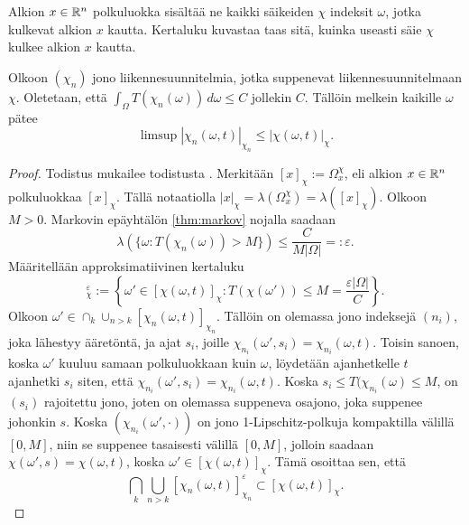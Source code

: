 \documentclass[12pt,oneside,a4paper]{amsbook} %
\begin{document}
Alkion $x\in \mathbb{R}^n$ polkuluokka sisältää ne kaikki säikeiden $\chi$ indeksit $\omega$, jotka kulkevat alkion $x$ kautta. Kertaluku kuvastaa taas sitä, kuinka useasti säie $\chi$ kulkee alkion $x$ kautta.

\begin{theorem} \label{thm:multiplicityXnLeX}
    Olkoon $(\chi_n)$ jono liikennesuunnitelmia, jotka suppenevat liikennesuunnitelmaan $\chi$. Oletetaan, että $\int_\Omega T(\chi_n(\omega))\, d\omega \le C$ jollekin $C$. Tällöin melkein kaikille $\omega$ pätee
    \begin{equation*}
        \limsup |\chi_n(\omega, t)|_{\chi_n} \le |\chi(\omega, t)|_\chi.
    \end{equation*}
\end{theorem}
\begin{proof}
    Todistus mukailee todistusta \cite[s. 31-32]{optimal}. Merkitään $[x]_\chi := \Omega_x^\chi$, eli alkion $x\in \mathbb{R}^n$ polkuluokkaa $[x]_\chi$. Tällä notaatiolla $|x|_\chi = \lambda(\Omega_x^\chi) = \lambda([x]_\chi)$. Olkoon $M > 0.$ Markovin epäyhtälön \ref{thm:markov} nojalla saadaan
    \begin{equation*}
        \lambda(\{\omega : T(\chi_n(\omega)) > M\}) \le \frac{C}{M|\Omega|} =: \varepsilon.
    \end{equation*}
    Määritellään approksimatiivinen kertaluku
    \begin{equation*}
        [\chi(\omega,t)]_\chi^\varepsilon := \left\{\omega' \in [\chi(\omega, t)]_\chi : T(\chi(\omega')) \le M = \frac{\varepsilon|\Omega|}{C}\right\}.
    \end{equation*}
    Olkoon $\omega' \in \cap_k \cup_{n > k} [\chi_n(\omega, t)]_{\chi_n}$. Tällöin on olemassa jono  indeksejä $(n_i)$, joka lähestyy ääretöntä, ja ajat $s_i$, joille $\chi_{n_i}(\omega',s_i) = \chi_{n_i}(\omega, t)$. Toisin sanoen, koska $\omega'$ kuuluu samaan polkuluokkaan kuin $\omega$, löydetään ajanhetkelle $t$ ajanhetki $s_i$ siten, että $\chi_{n_i}(\omega',s_i) = \chi_{n_i}(\omega, t)$. Koska $s_i\le T(\chi_{n_i}(\omega) \le M$, on $(s_i)$ rajoitettu jono, joten on olemassa suppeneva osajono, joka suppenee johonkin $s$. Koska $(\chi_{n_i}(\omega', \cdot))$ on jono 1-Lipschitz-polkuja kompaktilla välillä $[0, M]$, niin se suppenee tasaisesti välillä $[0, M]$, jolloin saadaan $\chi(\omega', s) = \chi(\omega, t)$, koska $\omega' \in [\chi(\omega, t)]_\chi$. Tämä osoittaa sen, että 
    \begin{equation}\label{eq:multiplicityOfXn1}
        \bigcap_k \bigcup_{n > k} [\chi_n(\omega, t)]_{\chi_n}^\varepsilon \subset [\chi(\omega, t)]_\chi.
    \end{equation}
    

\end{proof}
\end{document}
